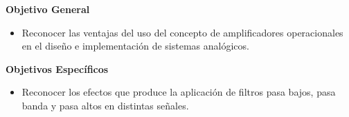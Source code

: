\textbf{Objetivo General}

\begin{itemize}
    \item Reconocer las ventajas del uso del concepto de amplificadores operacionales en el diseño e implementación de sistemas analógicos.
\end{itemize}

\textbf{Objetivos Específicos}

\begin{itemize}
    \item Reconocer los efectos que produce la aplicación de filtros pasa bajos, pasa banda y pasa altos en distintas señales.
\end{itemize}
